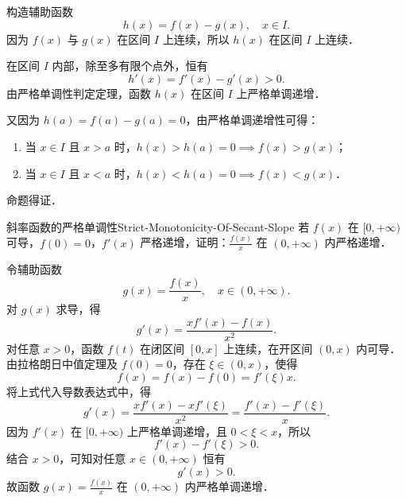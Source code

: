 \begin{myproof}
    构造辅助函数
    \begin{equation}
        h(x) = f(x) - g(x), \quad x \in I.
    \end{equation}
    因为 $f(x)$ 与 $g(x)$ 在区间 $I$ 上连续，所以 $h(x)$ 在区间 $I$ 上连续．

    在区间 $I$ 内部，除至多有限个点外，恒有
    \begin{equation}
        h'(x) = f'(x) - g'(x) > 0.
    \end{equation}
    由严格单调性判定定理，函数 $h(x)$ 在区间 $I$ 上严格单调递增．

    又因为 $h(a) = f(a) - g(a) = 0$，由严格单调递增性可得：
    \begin{enumerate}
        \item 当 $x \in I$ 且 $x > a$ 时，$h(x) > h(a) = 0 \implies f(x) > g(x)$；
        \item 当 $x \in I$ 且 $x < a$ 时，$h(x) < h(a) = 0 \implies f(x) < g(x)$．
    \end{enumerate}
    命题得证．
\end{myproof}

\begin{problem}{斜率函数的严格单调性}{Strict-Monotonicity-Of-Secant-Slope}
    若 $f(x)$ 在 $[0, +\infty)$ 可导，$f(0) = 0$，$f'(x)$ 严格递增，证明：$\frac{f(x)}{x}$ 在 $(0, +\infty)$ 内严格递增．
\end{problem}

\begin{myproof}
    令辅助函数
    \begin{equation}
        g(x) = \frac{f(x)}{x}, \quad x \in (0, +\infty).
    \end{equation}
    对 $g(x)$ 求导，得
    \begin{equation}
        g'(x) = \frac{x f'(x) - f(x)}{x^2}.
    \end{equation}
    对任意 $x > 0$，函数 $f(t)$ 在闭区间 $[0, x]$ 上连续，在开区间 $(0, x)$ 内可导．由拉格朗日中值定理及 $f(0) = 0$，存在 $\xi \in (0, x)$，使得
    \begin{equation}
        f(x) = f(x) - f(0) = f'(\xi)x.
    \end{equation}
    将上式代入导数表达式中，得
    \begin{equation}
        g'(x) = \frac{x f'(x) - x f'(\xi)}{x^2} = \frac{f'(x) - f'(\xi)}{x}.
    \end{equation}
    因为 $f'(x)$ 在 $[0, +\infty)$ 上严格单调递增，且 $0 < \xi < x$，所以
    \begin{equation}
        f'(x) - f'(\xi) > 0.
    \end{equation}
    结合 $x > 0$，可知对任意 $x \in (0, +\infty)$ 恒有
    \begin{equation}
        g'(x) > 0.
    \end{equation}
    故函数 $g(x) = \frac{f(x)}{x}$ 在 $(0, +\infty)$ 内严格单调递增．
\end{myproof}

